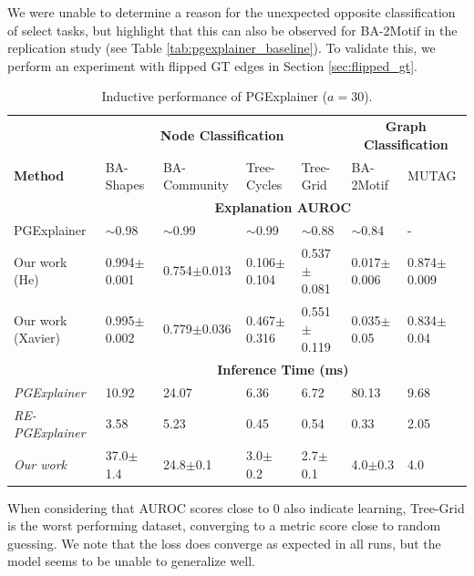 We were unable to determine a reason for the unexpected opposite classification of select tasks, but highlight that this can also be observed for BA-2Motif in the replication study \cite{holdijk2021re} (see Table \ref{tab:pgexplainer_baseline}). To validate this, we perform an experiment with flipped \ac{GT} edges in Section \ref{sec:flipped_gt}. \bigskip

\begin{table}[ht]
    \centering
    \scriptsize
    \begin{tabularx}{\textwidth}{l|XXXX|XX}   %
    \textbf{} & \multicolumn{4}{c}{\textbf{Node Classification}} & \multicolumn{2}{c}{\textbf{Graph Classification}} \\
    \textbf{Method} & BA-Shapes & BA-Community & Tree-Cycles & Tree-Grid & BA-2Motif & MUTAG \\
    \midrule
    \addlinespace
    \textbf{} & \multicolumn{6}{c}{\textbf{Explanation AUROC}} \\
    \midrule
    PGExplainer & $\sim$0.98 & $\sim$0.99 & $\sim$0.99 & $\sim$0.88 & $\sim$0.84 & - \\
    \midrule
    Our work (He) & 0.994$\pm$0.001 & 0.754$\pm$0.013 & 0.106$\pm$0.104 & 0.537$\pm$0.081 & 0.017$\pm$0.006 & 0.874$\pm$0.009 \\
    \midrule
    Our work (Xavier) & 0.995$\pm$0.002 & 0.779$\pm$0.036 & 0.467$\pm$0.316 & 0.551$\pm$0.119 & 0.035$\pm$0.05 & 0.834$\pm$0.04 \\
    \midrule
    \addlinespace
    \textbf{} & \multicolumn{6}{c}{\textbf{Inference Time (ms)}} \\
    \midrule
    \textit{PGExplainer} & 10.92 & 24.07 & 6.36 & 6.72 & 80.13 & 9.68 \\
    \textit{RE-PGExplainer} & 3.58 & 5.23 & 0.45 & 0.54 & 0.33 & 2.05 \\
    \textit{Our work} & 37.0$\pm$1.4 & 24.8$\pm$0.1 & 3.0$\pm$0.2 & 2.7$\pm$0.1 & 4.0$\pm$0.3 & 4.0 \\
    \bottomrule
    \end{tabularx}
    \caption[Inductive performance of our reimplementation]{Inductive performance of PGExplainer ($a=30$).}
    \label{tab:pgexplainer_auc}
\end{table}

When considering that AUROC scores close to 0 also indicate learning, Tree-Grid is the worst performing dataset, converging to a metric score close to random guessing. We note that the loss does converge as expected in all runs, but the model seems to be unable to generalize well.

